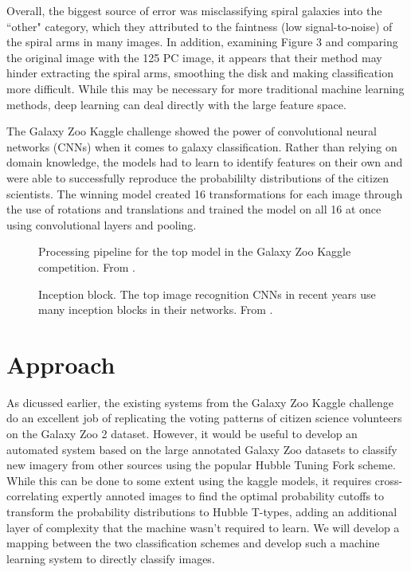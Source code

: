 \documentclass[twocolumn]{aastex6}
\begin{document}
Overall, the biggest source of error was misclassifying spiral galaxies into the ``other" category, which they attributed to the faintness (low signal-to-noise) of the spiral arms in many images. In addition, examining Figure 3 and comparing the original image with the 125 PC image, it appears that their method may hinder extracting the spiral arms, smoothing the disk and making classification more difficult. While this may be necessary for more traditional machine learning methods, deep learning can deal directly with the large feature space.

The Galaxy Zoo Kaggle challenge showed the power of convolutional neural networks (CNNs) when it comes to galaxy classification. Rather than relying on domain knowledge, the models had to learn to identify features on their own and were able to successfully reproduce the probabililty distributions of the citizen scientists. The winning model created 16 transformations for each image through the use of rotations and translations and trained the model on all 16 at once using convolutional layers and pooling.

\begin{figure*}[!t]
\caption{Processing pipeline for the top model in the Galaxy Zoo Kaggle competition. From \cite{2015MNRAS.450.1441D}.}
\end{figure*}

\begin{figure}[!t]
\caption{Inception block. The top image recognition CNNs in recent years use many inception blocks in their networks. From \cite{2014arXiv1409.4842S}.}
\label{fig:inception}
\end{figure}

\cite{2015MNRAS.450.1441D}


\section{Approach}
As dicussed earlier, the existing systems from the Galaxy Zoo Kaggle challenge do an excellent job of replicating the voting patterns of citizen science volunteers on the Galaxy Zoo 2 dataset. However, it would be useful to develop an automated system based on the large annotated Galaxy Zoo datasets to classify new imagery from other sources using the popular Hubble Tuning Fork scheme. While this can be done to some extent using the kaggle models, it requires cross-correlating expertly annoted images to find the optimal probability cutoffs to transform the probability distributions to Hubble T-types, adding an additional layer of complexity that the machine wasn't required to learn. We will develop a mapping between the two classification schemes and develop such a machine learning system to directly classify images. 
\end{document}
